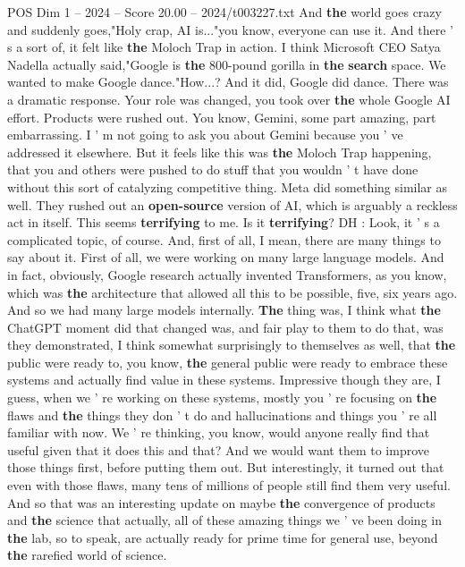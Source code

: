 \begin{textsample}{POS Dim 1 – 2024 – Score 20.00 – 2024/t003227.txt}
And \textbf{the} world goes crazy and suddenly goes,"Holy crap, AI is..."you know, everyone can use it.
And there ' s a sort of, it felt like \textbf{the} Moloch Trap in action.
I think Microsoft CEO Satya Nadella actually said,"Google is \textbf{the} 800-pound gorilla in \textbf{the} \textbf{search} space.
We wanted to make Google dance."How...?
And it did, Google did dance.
There was a dramatic response.
Your role was changed, you took over \textbf{the} whole Google AI effort.
Products were rushed out.
You know, Gemini, some part amazing, part embarrassing.
I ' m not going to ask you about Gemini because you ' ve addressed it elsewhere.
But it feels like this was \textbf{the} Moloch Trap happening, that you and others were pushed to do stuff that you wouldn ' t have done without this sort of catalyzing competitive thing.
Meta did something similar as well.
They rushed out an \textbf{open-source} version of AI, which is arguably a reckless act in itself.
This seems \textbf{terrifying} to me.
Is it \textbf{terrifying}?
DH : Look, it ' s a complicated topic, of course.
And, first of all, I mean, there are many things to say about it.
First of all, we were working on many large language models.
And in fact, obviously, Google research actually invented Transformers, as you know, which was \textbf{the} architecture that allowed all this to be possible, five, six years ago.
And so we had many large models internally. \textbf{The} thing was, I think what \textbf{the} ChatGPT moment did that changed was, and fair play to them to do that, was they demonstrated, I think somewhat surprisingly to themselves as well, that \textbf{the} public were ready to, you know, \textbf{the} general public were ready to embrace these systems and actually find value in these systems.
Impressive though they are, I guess, when we ' re working on these systems, mostly you ' re focusing on \textbf{the} flaws and \textbf{the} things they don ' t do and hallucinations and things you ' re all familiar with now.
We ' re thinking, you know, would anyone really find that useful given that it does this and that?
And we would want them to improve those things first, before putting them out.
But interestingly, it turned out that even with those flaws, many tens of millions of people still find them very useful.
And so that was an interesting update on maybe \textbf{the} convergence of products and \textbf{the} science that actually, all of these amazing things we ' ve been doing in \textbf{the} lab, so to speak, are actually ready for prime time for general use, beyond \textbf{the} rarefied world of science.

\end{textsample}
